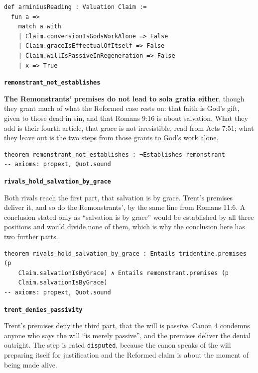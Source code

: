 \documentclass[11pt]{article}
\begin{document}
{\small\begin{verbatim}
def arminiusReading : Valuation Claim :=
  fun a =>
    match a with
    | Claim.conversionIsGodsWorkAlone => False
    | Claim.graceIsEffectualOfItself => False
    | Claim.willIsPassiveInRegeneration => False
    | x => True
\end{verbatim}}
\par\medskip\noindent\textbf{\texttt{remonstrant\_\allowbreak{}not\_\allowbreak{}establishes}}\par\nobreak\noindent
\textbf{The Remonstrants’ premises do not lead to sola gratia either}, though they grant much of what the Reformed case rests on: that faith is God’s gift, given to those dead in sin, and that Romans 9:16 is about salvation. What they add is their fourth article, that grace is not irresistible, read from Acts 7:51; what they leave out is the two steps from those grants to God’s work alone.

{\small\begin{verbatim}
theorem remonstrant_not_establishes : ¬Establishes remonstrant
-- axioms: propext, Quot.sound
\end{verbatim}}
\par\medskip\noindent\textbf{\texttt{rivals\_\allowbreak{}hold\_\allowbreak{}salvation\_\allowbreak{}by\_\allowbreak{}grace}}\par\nobreak\noindent
Both rivals reach the first part, that salvation is by grace. Trent’s premises deliver it, and so do the Remonstrants’, by the same line from Romans 11:6. A conclusion stated only as “salvation is by grace” would be established by all three positions and would divide none of them, which is why the conclusion here has two further parts.

{\small\begin{verbatim}
theorem rivals_hold_salvation_by_grace : Entails tridentine.premises (p
    Claim.salvationIsByGrace) ∧ Entails remonstrant.premises (p
    Claim.salvationIsByGrace)
-- axioms: propext, Quot.sound
\end{verbatim}}
\par\medskip\noindent\textbf{\texttt{trent\_\allowbreak{}denies\_\allowbreak{}passivity}}\par\nobreak\noindent
Trent’s premises deny the third part, that the will is passive. Canon 4 condemns anyone who says the will “is merely passive”, and the premises deliver the denial outright. The step is rated \texttt{disputed}, because the canon speaks of the will preparing itself for justification and the Reformed claim is about the moment of being made alive.
\end{document}
